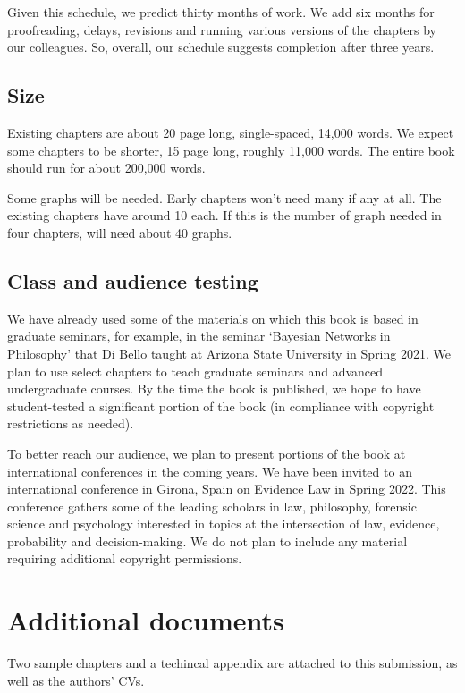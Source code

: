 \documentclass[
  10pt,
  dvipsnames,enabledeprecatedfontcommands]{scrartcl}
\begin{document}
Given this schedule, we predict thirty months of work. We add six months
for proofreading, delays, revisions and running various versions of the
chapters by our colleagues. So, overall, our schedule suggests
completion after three years.

\hypertarget{size}{%
\subsection{Size}\label{size}}

Existing chapters are about 20 page long, single-spaced, 14,000 words.
We expect some chapters to be shorter, 15 page long, roughly 11,000
words. The entire book should run for about 200,000 words.

Some graphs will be needed. Early chapters won't need many if any at
all. The existing chapters have around 10 each. If this is the number of
graph needed in four chapters, will need about 40 graphs.

\hypertarget{class-and-audience-testing}{%
\subsection{Class and audience
testing}\label{class-and-audience-testing}}

We have already used some of the materials on which this book is based
in graduate seminars, for example, in the seminar `Bayesian Networks in
Philosophy' that Di Bello taught at Arizona State University in Spring
2021. We plan to use select chapters to teach graduate seminars and
advanced undergraduate courses. By the time the book is published, we
hope to have student-tested a significant portion of the book (in
compliance with copyright restrictions as needed).

To better reach our audience, we plan to present portions of the book at
international conferences in the coming years. We have been invited to
an international conference in Girona, Spain on Evidence Law in Spring
2022. This conference gathers some of the leading scholars in law,
philosophy, forensic science and psychology interested in topics at the
intersection of law, evidence, probability and decision-making. We do
not plan to include any material requiring additional copyright
permissions.

\hypertarget{additional-documents}{%
\section{Additional documents}\label{additional-documents}}

Two sample chapters and a techincal appendix are attached to this
submission, as well as the authors' CVs.
\end{document}
